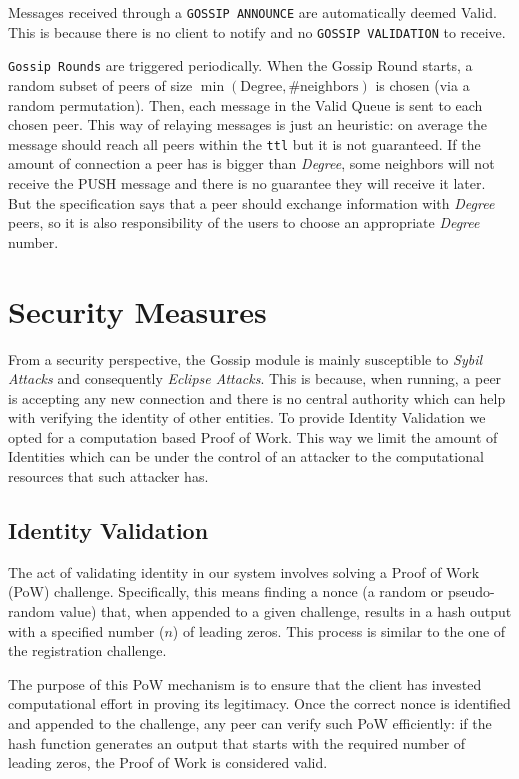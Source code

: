 \documentclass[a4paper,english,10pt,NET]{tumarticle}
\begin{document}
Messages received through a \texttt{GOSSIP ANNOUNCE} are automatically deemed Valid. This is because there is no client to notify and no \texttt{GOSSIP VALIDATION} to receive.

\texttt{Gossip Rounds} are triggered periodically. When the Gossip Round starts, a random subset of peers of size $\min(\text{Degree}, \text{\# neighbors})$ is chosen (via a random permutation). Then, each message in the Valid Queue is sent to each chosen peer. This way of relaying messages is just an heuristic: on average the message should reach all peers within the \texttt{ttl} but it is not guaranteed. If the amount of connection a peer has is bigger than \textit{Degree}, some neighbors will not receive the PUSH message and there is no guarantee they will receive it later. But the specification says that a peer should exchange information with \textit{Degree} peers, so it is also responsibility of the users to choose an appropriate \textit{Degree} number.


\section{Security Measures} \label{sec:security}

From a security perspective, the Gossip module is mainly susceptible to \textit{Sybil Attacks} and consequently \textit{Eclipse Attacks}. This is because, when running, a peer is accepting any new connection and there is no central authority which can help with verifying the identity of other entities. To provide Identity Validation we opted for a computation based Proof of Work. This way we limit the amount of Identities which can be under the control of an attacker to the computational resources that such attacker has. 

\subsection{Identity Validation}

The act of validating identity in our system involves solving a Proof of Work (PoW) challenge. Specifically, this means finding a nonce (a random or pseudo-random value) that, when appended to a given challenge, results in a hash output with a specified number ($n$) of leading zeros. This process is similar to the one of the registration challenge.

The purpose of this PoW mechanism is to ensure that the client has invested computational effort in proving its legitimacy. Once the correct nonce is identified and appended to the challenge, any peer can verify such PoW efficiently: if the hash function generates an output that starts with the required number of leading zeros, the Proof of Work is considered valid.
\end{document}
